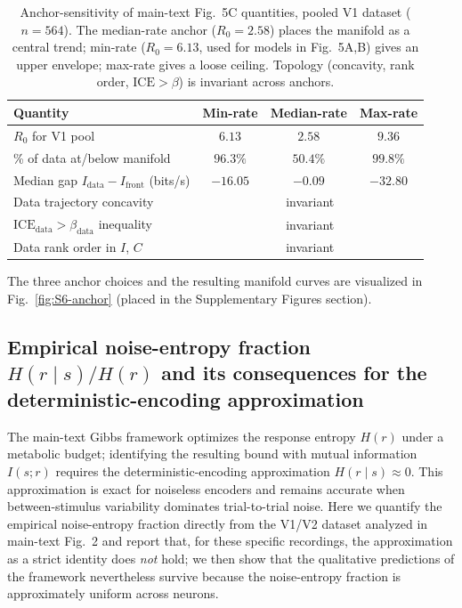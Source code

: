 \documentclass[11pt]{article}
\theoremstyle{remark}
\theoremstyle{definition}
\begin{document}
\begin{table}[h!]
\centering
\caption{Anchor-sensitivity of main-text Fig.~5C quantities, pooled V1 dataset ($n=564$).  The median-rate anchor ($R_0=2.58$) places the manifold as a central trend; min-rate ($R_0=6.13$, used for models in Fig.~5A,B) gives an upper envelope; max-rate gives a loose ceiling.  Topology (concavity, rank order, $\mathrm{ICE}>\beta$) is invariant across anchors.}
\label{tab:anchor-summary}
\begin{tabular}{lccc}
\toprule
Quantity & Min-rate & Median-rate & Max-rate \\
\midrule
$R_0$ for V1 pool & $6.13$ & $2.58$ & $9.36$ \\
\% of data at/below manifold & $96.3\%$ & $50.4\%$ & $99.8\%$ \\
Median gap $I_{\mathrm{data}}{-}I_{\mathrm{front}}$ (bits/s) & $-16.05$ & $-0.09$ & $-32.80$ \\
Data trajectory concavity & \multicolumn{3}{c}{invariant} \\
$\mathrm{ICE}_{\mathrm{data}}>\beta_{\mathrm{data}}$ inequality & \multicolumn{3}{c}{invariant} \\
Data rank order in $I$, $C$ & \multicolumn{3}{c}{invariant} \\
\bottomrule
\end{tabular}
\end{table}

The three anchor choices and the resulting manifold curves are visualized in Fig.~\ref{fig:S6-anchor} (placed in the Supplementary Figures section).

\subsection{Empirical noise-entropy fraction $H(r\mid s)/H(r)$ and its consequences for the deterministic-encoding approximation}
\label{sec:noise-entropy-check}

The main-text Gibbs framework optimizes the response entropy $H(r)$ under a metabolic budget; identifying the resulting bound with mutual information $I(s;r)$ requires the deterministic-encoding approximation $H(r\mid s)\approx 0$.  This approximation is exact for noiseless encoders and remains accurate when between-stimulus variability dominates trial-to-trial noise.  Here we quantify the empirical noise-entropy fraction directly from the V1/V2 dataset analyzed in main-text Fig.~2 and report that, for these specific recordings, the approximation as a strict identity does \emph{not} hold; we then show that the qualitative predictions of the framework nevertheless survive because the noise-entropy fraction is approximately uniform across neurons.
\end{document}

